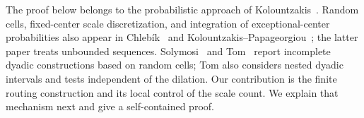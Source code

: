 The proof below belongs to the probabilistic approach of
Kolountzakis~\cite{Kolountzakis1997}. Random cells, fixed-center
scale discretization, and integration of exceptional-center
probabilities also appear in Chleb\'ik~\cite[Section~5]{Chlebik2015}
and Kolountzakis--Papageorgiou~\cite[Section~3.1]{KolountzakisPapageorgiou2025};
the latter paper treats unbounded sequences. Solymosi~\cite[Section~3]{Solymosi2011Sparse}
and Tom~\cite{Tom2015} report incomplete dyadic constructions based on
random cells; Tom also considers nested dyadic intervals and tests
independent of the dilation. Our contribution is the
finite routing construction and its local control of the scale
count. We explain that mechanism next and give a self-contained proof.
